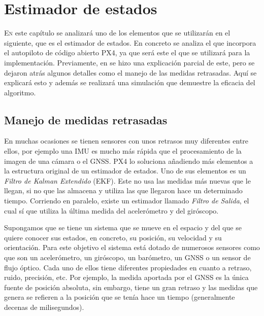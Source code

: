 \chapter{Estimador de estados}\label{chp:1}

\lettrine[lraise=-0.1, lines=2, loversize=0.2]{E}{n} este capítulo se analizará uno de los elementos que se utilizarán en el siguiente, que es el estimador de estados. En concreto se analiza el que incorpora el autopiloto de código abierto PX4, ya que será este el que se utilizará para la implementación. Previamente, en \cite{arias2019control} se hizo una explicación parcial de este, pero se dejaron atrás algunos detalles como el manejo de las medidas retrasadas. Aquí se explicará esto y además se realizará una simulación que demuestre la eficacia del algoritmo.

\section{Manejo de medidas retrasadas}
En muchas ocasiones se tienen sensores con unos retrasos muy diferentes entre ellos, por ejemplo una IMU es mucho más rápida que el procesamiento de la imagen de una cámara o el GNSS. PX4 lo soluciona añadiendo más elementos a la estructura original de un estimador de estados. Uno de sus elementos es un \textit{Filtro de Kalman Extendido} (EKF). Este no usa las medidas más nuevas que le llegan, si no que las almacena y utiliza las que llegaron hace un determinado tiempo. Corriendo en paralelo, existe un estimador llamado \textit{Filtro de Salida}, el cual sí que utiliza la última medida del acelerómetro y del giróscopo. 


Supongamos que se tiene un sistema que se mueve en el espacio y del que se quiere conocer sus estados, en concreto, su posición, su velocidad y su orientación. Para este objetivo el sistema está dotado de numerosos sensores como que son un acelerómetro, un giróscopo, un barómetro, un GNSS o un sensor de flujo óptico. Cada uno de ellos tiene diferentes propiedades en cuanto a retraso, ruido, precisión, etc. Por ejemplo, la medida aportada por el GNSS es la única fuente de posición absoluta, sin embargo, tiene un gran retraso y las medidas que genera se refieren a la posición que se tenía hace un tiempo (generalmente decenas de milisegundos). 

